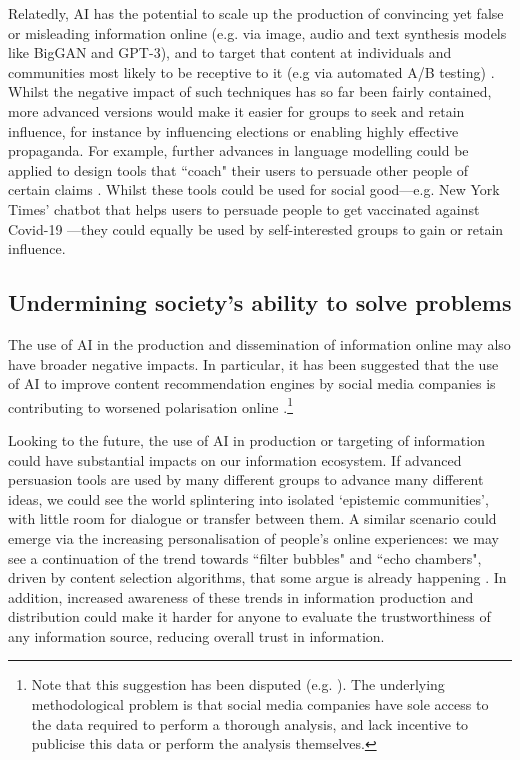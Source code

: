 \documentclass{article}
\begin{document}
Relatedly, AI has the potential to scale up the production of convincing yet false or misleading information online (e.g. via image, audio and text synthesis models like BigGAN and GPT-3), and to target that content at individuals and communities most likely to be receptive to it (e.g via automated A/B testing) \citep{seger_tackling_2020}. Whilst the negative impact of such techniques has so far been fairly contained, more advanced versions would make it easier for groups to seek and retain influence, for instance by influencing elections or enabling highly effective propaganda.  For example, further advances in language modelling could be applied to design tools that ``coach" their users to persuade other people of certain claims \citep{kokotajlo_persuasion_2020}. Whilst these tools could be used for social good---e.g. New York Times’ chatbot that helps users to persuade people to get vaccinated against Covid-19 \citep{gagneur_opinion_2021}---they could equally be used by self-interested groups to gain or retain influence.

\subsection{Undermining society’s ability to solve problems}

The use of AI in the production and dissemination of information online may also have broader negative impacts. In particular, it has been suggested that the use of AI to improve content recommendation engines by social media companies is contributing to worsened polarisation online \citep{ribeiro_auditing_2019,faddoul_longitudinal_2020}.\footnote{ Note that this suggestion has been disputed (e.g. \citealt{ledwich_algorithmic_2019,boxell_greater_2017}). The underlying methodological problem is that social media companies have sole access to the data required to perform a thorough analysis, and lack incentive to publicise this data or perform the analysis themselves.} 


Looking to the future, the use of AI in production or targeting of information could have substantial impacts on our information ecosystem. If advanced persuasion tools are used by many different groups to advance many different ideas, we could see the world splintering into isolated ‘epistemic communities’, with little room for dialogue or transfer between them. A similar scenario could emerge via the increasing personalisation of people’s online experiences: we may see a continuation of the trend towards ``filter bubbles" and ``echo chambers", driven by content selection algorithms, that some argue is already happening \citep{barbera_tweeting_2015,flaxman_filter_2016,nguyen_exploring_2014}. In addition, increased awareness of these trends in information production and distribution could make it harder for anyone to evaluate the trustworthiness of any information source, reducing overall trust in information.
\end{document}
